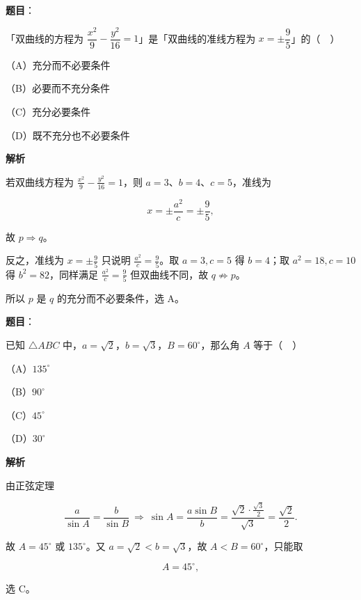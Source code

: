 \begin{answer}

\textbf{题目}：

「双曲线的方程为 $\dfrac{x^2}{9}-\dfrac{y^2}{16}=1$」是「双曲线的准线方程为 $x=\pm\dfrac95$」的（　）

（A）充分而不必要条件

（B）必要而不充分条件

（C）充分必要条件

（D）既不充分也不必要条件

\textbf{解析}

若双曲线方程为 $\frac{x^2}{9}-\frac{y^2}{16}=1$，则 $a=3$、$b=4$、$c=5$，准线为

\nopagebreak[4]
\[x=\pm\frac{a^2}{c}=\pm\frac95,\]

故 $p\Rightarrow q$。

反之，准线为 $x=\pm\frac95$ 只说明 $\frac{a^2}{c}=\frac95$。取 $a=3,c=5$ 得 $b=4$；取 $a^2=18,c=10$ 得 $b^2=82$，同样满足 $\frac{a^2}{c}=\frac95$ 但双曲线不同，故 $q\not\Rightarrow p$。

所以 $p$ 是 $q$ 的充分而不必要条件，选 A。


\end{answer}
\begin{answer}

\textbf{题目}：

已知 $\triangle ABC$ 中，$a=\sqrt2$，$b=\sqrt3$，$B=60^\circ$，那么角 $A$ 等于（　）

（A）$135^\circ$

（B）$90^\circ$

（C）$45^\circ$

（D）$30^\circ$

\textbf{解析}

由正弦定理

\nopagebreak[4]
\[\frac{a}{\sin A}=\frac{b}{\sin B}\ \Longrightarrow\ \sin A=\frac{a\sin B}{b}=\frac{\sqrt2\cdot\frac{\sqrt3}{2}}{\sqrt3}=\frac{\sqrt2}{2}.\]

故 $A=45^\circ$ 或 $135^\circ$。又 $a=\sqrt2<b=\sqrt3$，故 $A<B=60^\circ$，只能取

\nopagebreak[4]
\[A=45^\circ,\]

选 C。


\end{answer}
